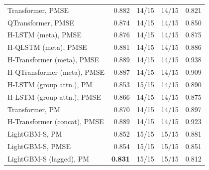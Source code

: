 \begin{tabular}{lrrrr}
Transformer, PMSE & 0.882 & 14/15 & 14/15 & 0.821 \\
QTransformer, PMSE & 0.874 & 14/15 & 14/15 & 0.850 \\
H-LSTM (meta), PMSE & 0.876 & 14/15 & 14/15 & 0.875 \\
H-QLSTM (meta), PMSE & 0.881 & 14/15 & 14/15 & 0.886 \\
H-Transformer (meta), PMSE & 0.889 & 14/15 & 14/15 & 0.938 \\
H-QTransformer (meta), PMSE & 0.887 & 14/15 & 14/15 & 0.909 \\
H-LSTM (group attn.), PM & 0.853 & 15/15 & 14/15 & 0.890 \\
H-LSTM (group attn.), PMSE & 0.866 & 14/15 & 14/15 & 0.875 \\
Transformer, PM & 0.870 & 14/15 & 14/15 & 0.897 \\
H-Transformer (concat), PMSE & 0.889 & 14/15 & 14/15 & 0.923 \\
LightGBM-S, PM & 0.852 & 15/15 & 15/15 & 0.881 \\
LightGBM-S, PMSE & 0.854 & 15/15 & 15/15 & 0.851 \\
LightGBM-S (lagged), PM & \textbf{0.831} & 15/15 & 15/15 & 0.812 \\
\bottomrule
\end{tabular}
